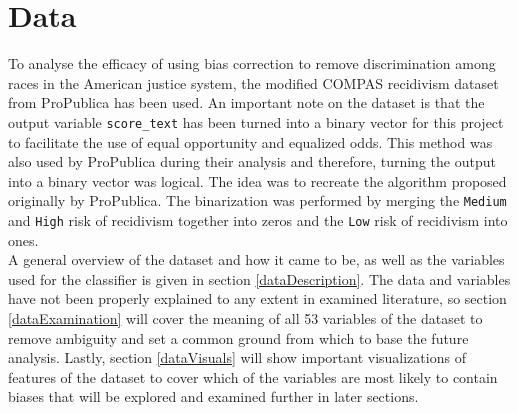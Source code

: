 \documentclass[11pt, fleqn, titlepage]{article}
\begin{document}
	\section{Data} \label{data}
	
	\noindent To analyse the efficacy of using bias correction to remove discrimination among races in the American justice system, the modified COMPAS recidivism dataset from ProPublica has been used. An important note on the dataset is that the output variable \texttt{score\_text} has been turned into a binary vector for this project to facilitate the use of equal opportunity and equalized odds. This method was also used by ProPublica during their analysis and therefore, turning the output into a binary vector was logical. The idea was to recreate the algorithm proposed originally by ProPublica. The binarization was performed by merging the \texttt{Medium} and \texttt{High} risk of recidivism together into zeros and the \texttt{Low} risk of recidivism into ones. \\
	A general overview of the dataset and how it came to be, as well as the variables used for the classifier is given in section \ref{dataDescription}. The data and variables have not been properly explained to any extent in examined literature, so section \ref{dataExamination} will cover the meaning of all 53 variables of the dataset to remove ambiguity and set a common ground from which to base the future analysis. Lastly, section \ref{dataVisuals} will show important visualizations of features of the dataset to cover which of the variables are most likely to contain biases that will be explored and examined further in later sections.
	
\end{document}
